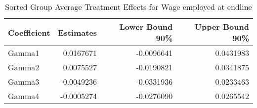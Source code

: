 \begin{table}

\caption{\label{tab:gatesQempl}Sorted Group Average Treatment Effects for Wage employed at endline}
\centering
\begin{tabular}[t]{lrrr}
\toprule
Coefficient & Estimates & Lower Bound 90\% & Upper Bound 90\%\\
\midrule
Gamma1 & 0.0167671 & -0.0096641 & 0.0431983\\
Gamma2 & 0.0075527 & -0.0190821 & 0.0341875\\
Gamma3 & -0.0049236 & -0.0331936 & 0.0233463\\
Gamma4 & -0.0005274 & -0.0276090 & 0.0265542\\
\bottomrule
\end{tabular}
\end{table}
